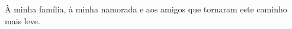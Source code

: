 
\null\vskip5cm%
\begin{flushright}
     À minha família, à minha namorada e aos amigos que tornaram este caminho mais leve.
\end{flushright}
\vfill\newpage

